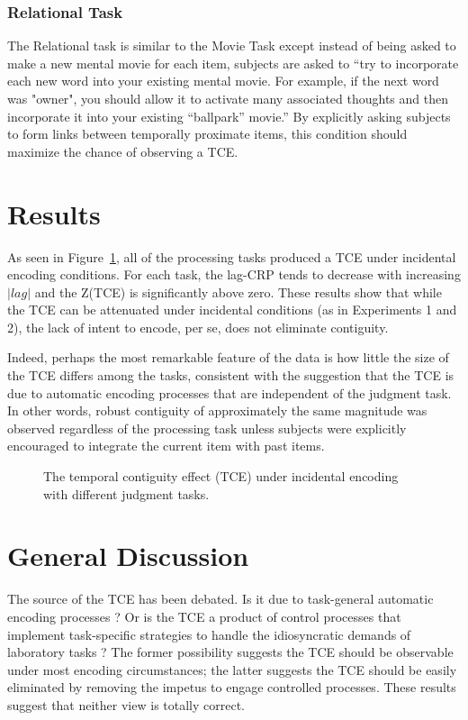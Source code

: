 \documentclass[man,natbib,floatsintext]{apa6} %
\begin{document}
\subsubsection{Relational Task} The Relational task is similar to the Movie Task except instead of being asked to make a new mental movie for each item, subjects are asked to ``try to incorporate each new word into your existing mental movie. For example, if the next word was "owner", you should allow it to activate many associated thoughts and then incorporate it into your existing ``ballpark'' movie.'' By explicitly asking subjects to form links between temporally proximate items, this condition should maximize the chance of observing a TCE. 

\section{Results}

As seen in Figure~\ref{E3}, all of the processing tasks produced a TCE under incidental encoding conditions. For each task, the lag-CRP tends to decrease with increasing $|lag|$ and the Z(TCE) is significantly above zero. These results show that while the TCE can be attenuated under incidental conditions (as in Experiments 1 and 2), the lack of intent to encode, per se, does not eliminate contiguity. 

Indeed, perhaps the most remarkable feature of the data is how little the size of the TCE differs among the tasks, consistent with the suggestion that the TCE is due to automatic encoding processes that are independent of the judgment task. %
In other words, robust contiguity of approximately the same magnitude was observed regardless of the processing task unless subjects were explicitly encouraged to integrate the current item with past items.

\begin{figure}%
\caption{The temporal contiguity effect (TCE) under incidental encoding with different judgment tasks. \paneltext}
\label{E3}
\end{figure}

\section{General Discussion}
The source of the TCE has been debated. Is it due to task-general automatic encoding processes \citep{HealEtal14}? Or is the TCE a product of control processes that implement task-specific strategies to handle the idiosyncratic demands of laboratory tasks \citep{Hint16}? The former possibility suggests the TCE should be observable under most encoding circumstances; the latter suggests the TCE should be easily eliminated by removing the impetus to engage controlled processes. These results suggest that neither view is totally correct.
\end{document}
